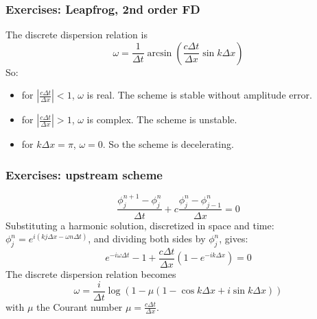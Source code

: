 \documentclass[aspectratio=149,9pt]{beamer}
\begin{document}
%
%
\begin{frame}
	\frametitle{Exercises: Leapfrog, 2nd order FD}
	The discrete dispersion relation is 
	\begin{equation*}
		\omega=\frac{1}{\Delta t}\arcsin\left(\frac{c\Delta t}{\Delta x}\sin k\Delta x\right)
	\end{equation*}
	So:
	\begin{itemize}
		\item for $\left|\frac{c\Delta t}{\Delta x}\right|<1$, $\omega$ is real. The scheme is stable without amplitude error.
		\item for $\left|\frac{c\Delta t}{\Delta x}\right|>1$, $\omega$ is complex. The scheme is unstable.
		\item for $k\Delta x=\pi$, $\omega=0$. So the scheme is decelerating.
	\end{itemize}
\end{frame}
%
%
\begin{frame}
	\frametitle{Exercises: upstream scheme}
	\begin{equation*}
		\frac{\phi_j^{n+1}-\phi_j^{n}}{\Delta t}+c\frac{\phi^n_{j}-\phi^n_{j-1}}{\Delta x}=0
	\end{equation*}
\pause
	Substituting a harmonic solution, discretized in space and time: $\phi_j^n=e^{i(kj\Delta x-\omega n \Delta t)}$, and dividing both sides by $\phi_j^n$, gives:
	\begin{equation*}
		e^{-i\omega\Delta t}-1+\frac{c\Delta t}{\Delta x}\left(1-e^{-ik\Delta x}\right)=0
	\end{equation*}
\pause
	The discrete dispersion relation becomes
	\begin{equation*}
		\omega=\frac{i}{\Delta t}\log\left(1-\mu\left(1-\cos k\Delta x+i\sin k\Delta x\right)\right)
	\end{equation*}
	with $\mu$ the Courant number $\mu=\frac{c\Delta t}{\Delta x}$.
\end{frame}
%
%
\end{document}
